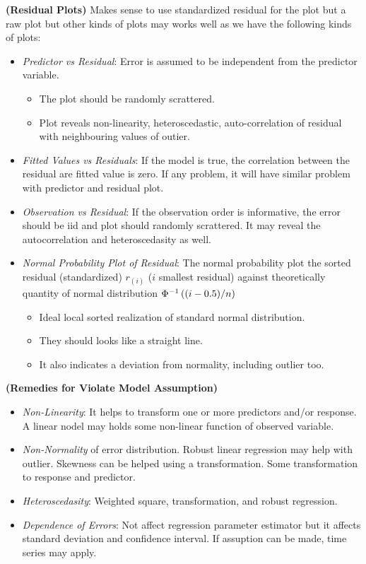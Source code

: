 \begin{remark}{\textbf{(Residual Plots)}}
    Makes sense to use standardized residual for the plot but a raw plot but other kinds of plots may works well as we have the following kinds of plots:
    \begin{itemize}
        \item \emph{Predictor vs Residual}: Error is assumed to be independent from the predictor variable. 
        \begin{itemize}
            \item The plot should be randomly scrattered. 
            \item Plot reveals non-linearity, heteroscedastic, auto-correlation of residual with neighbouring values of outier. 
        \end{itemize} 
        \item \emph{Fitted Values vs Residuals}: If the model is true, the correlation between the residual are fitted value is zero. If any problem, it will have similar problem with predictor and residual plot. 
        \item \emph{Observation vs Residual}: If the observation order is informative, the error should be iid and plot should randomly scrattered. It may reveal the autocorrelation and heteroscedasity as well. 
        \item \emph{Normal Probability Plot of Residual}: The normal probability plot the sorted residual (standardized) $r_{(i)}$ ($i$ smallest residual) against theoretically quantity of normal distribution $\Phi^{-1}\left( (i-0.5)/n \right)$
        \begin{itemize}
            \item Ideal local sorted realization of standard normal distribution.
            \item They should looks like a straight line. 
            \item It also indicates a deviation from normality, including outlier too.
        \end{itemize}
    \end{itemize}
\end{remark}

\begin{remark}{\textbf{(Remedies for Violate Model Assumption)}}
    \begin{itemize}
        \item \emph{Non-Linearity}: It helps to transform one or more predictors and/or response. A linear nodel may holds some non-linear function of observed variable.
        \item \emph{Non-Normality} of error distribution. Robust linear regression may help with outlier. Skewness can be helped using a transformation. Some transformation to response and predictor. 
        \item \emph{Heteroscedasity}: Weighted square, transformation, and robust regression. 
        \item \emph{Dependence of Errors}: Not affect regression parameter estimator but it affects standard deviation and confidence interval. If assuption can be made, time series may apply. 
    \end{itemize}
\end{remark}

